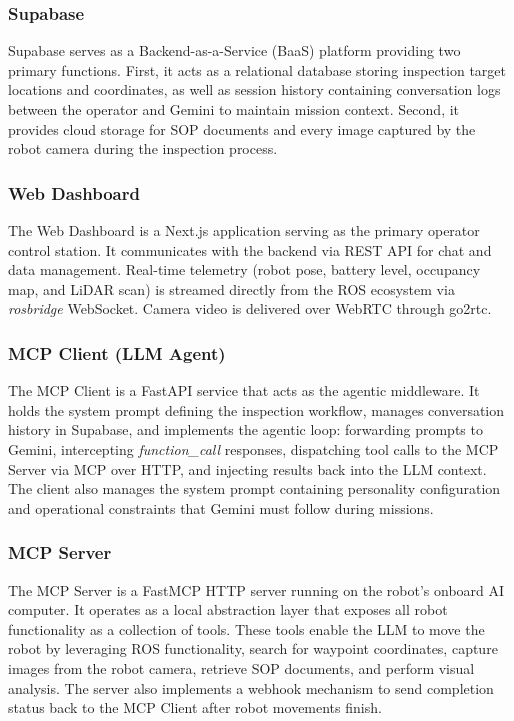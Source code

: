 \documentclass[conference]{IEEEtran}
\begin{document}
\subsubsection{Supabase}
Supabase serves as a Backend-as-a-Service (BaaS) platform providing two primary functions. First, it acts as a relational database storing inspection target locations and coordinates, as well as session history containing conversation logs between the operator and Gemini to maintain mission context. Second, it provides cloud storage for SOP documents and every image captured by the robot camera during the inspection process.

\subsubsection{Web Dashboard}
The Web Dashboard is a Next.js application serving as the primary operator control station. It communicates with the backend via REST API for chat and data management. Real-time telemetry (robot pose, battery level, occupancy map, and LiDAR scan) is streamed directly from the ROS ecosystem via \textit{rosbridge} WebSocket. Camera video is delivered over WebRTC through go2rtc.

\subsubsection{MCP Client (LLM Agent)}
The MCP Client is a FastAPI service that acts as the agentic middleware. It holds the system prompt defining the inspection workflow, manages conversation history in Supabase, and implements the agentic loop: forwarding prompts to Gemini, intercepting \textit{function\_call} responses, dispatching tool calls to the MCP Server via MCP over HTTP, and injecting results back into the LLM context. The client also manages the system prompt containing personality configuration and operational constraints that Gemini must follow during missions.

\subsubsection{MCP Server}
The MCP Server is a FastMCP HTTP server running on the robot's onboard AI computer. It operates as a local abstraction layer that exposes all robot functionality as a collection of tools. These tools enable the LLM to move the robot by leveraging ROS functionality, search for waypoint coordinates, capture images from the robot camera, retrieve SOP documents, and perform visual analysis. The server also implements a webhook mechanism to send completion status back to the MCP Client after robot movements finish.
\end{document}
